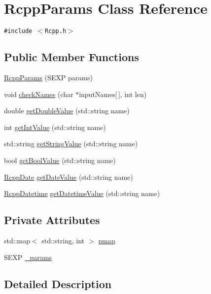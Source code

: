 \hypertarget{classRcppParams}{
\section{RcppParams Class Reference}
\label{classRcppParams}
}
{\tt \#include $<$Rcpp.h$>$}

\subsection*{Public Member Functions}
\begin{CompactItemize}
\item 
\hyperlink{classRcppParams_7315d083ee0d1d0ca00c3aad0175d524}{RcppParams} (SEXP params)
\item 
void \hyperlink{classRcppParams_1b8feaf39d3ffdf0f6773c44ac53736c}{checkNames} (char $\ast$inputNames\mbox{[}$\,$\mbox{]}, int len)
\item 
double \hyperlink{classRcppParams_a45f8bc1cd8a64aa9a98e24158407077}{getDoubleValue} (std::string name)
\item 
int \hyperlink{classRcppParams_bb554151641ab12a793f28d3d081973a}{getIntValue} (std::string name)
\item 
std::string \hyperlink{classRcppParams_dc04f4552582eeec09b0806ddd8e2581}{getStringValue} (std::string name)
\item 
bool \hyperlink{classRcppParams_d818a50a0e269360f3f74c5259dec882}{getBoolValue} (std::string name)
\item 
\hyperlink{classRcppDate}{RcppDate} \hyperlink{classRcppParams_ae20c7ee73aa2f1176837cc9387ad008}{getDateValue} (std::string name)
\item 
\hyperlink{classRcppDatetime}{RcppDatetime} \hyperlink{classRcppParams_a4bec8bfe32d5079e64dc1c9a8fcf1b9}{getDatetimeValue} (std::string name)
\end{CompactItemize}
\subsection*{Private Attributes}
\begin{CompactItemize}
\item 
std::map$<$ std::string, int $>$ \hyperlink{classRcppParams_399697fc90ba3136c61dd6e20931bd8b}{pmap}
\item 
SEXP \hyperlink{classRcppParams_3040dda3b32eff66fb73d3ba3874ca5b}{\_\-params}
\end{CompactItemize}


\subsection{Detailed Description}


